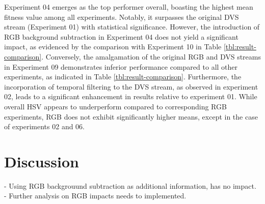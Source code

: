 \documentclass[sigchi,screen]{acmart}
\begin{document}
Experiment 04 emerges as the top performer overall, boasting the highest mean fitness value among all experiments. Notably, it surpasses the original DVS stream (Experiment 01) with statistical significance. However, the introduction of RGB background subtraction in Experiment 04 does not yield a significant impact, as evidenced by the comparison with Experiment 10 in Table \ref{tbl:result-comparison}. Conversely, the amalgamation of the original RGB and DVS streams in Experiment 09 demonstrates inferior performance compared to all other experiments, as indicated in Table \ref{tbl:result-comparison}. Furthermore, the incorporation of temporal filtering to the DVS stream, as observed in experiment 02, leads to a significant enhancement in results relative to experiment 01. While overall HSV appears to underperform compared to corresponding RGB experiments, RGB does not exhibit significantly higher means, except in the case of experiments 02 and 06.

\section{Discussion}
- Using RGB backgrouund subtraction as additional information, has no impact.
    - Further analysis on RGB impacts needs to implemented. \\
\end{document}
